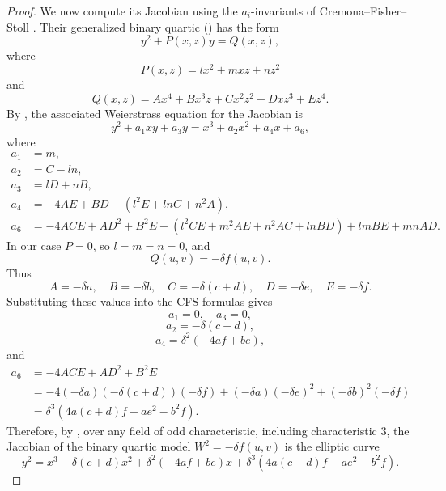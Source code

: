 \documentclass[11pt]{article}
\theoremstyle{definition}
\theoremstyle{definition}
\begin{document}
\begin{proof}
We now compute its Jacobian using the $a_i$-invariants of Cremona--Fisher--Stoll \cite{cremona2010minimisation}. Their generalized binary quartic (\cite[Definition~2.2]{cremona2010minimisation}) has the form
$$y^2+P(x,z)y=Q(x,z),$$
where
$$P(x,z)=lx^2+mxz+nz^2$$
and
$$Q(x,z)=Ax^4+Bx^3z+Cx^2z^2+Dxz^3+Ez^4.$$
By \cite[Lemma 2.9, Theorem~2.10]{cremona2010minimisation}, the associated Weierstrass
equation for the Jacobian is
$$y^2+a_1xy+a_3y=x^3+a_2x^2+a_4x+a_6,$$
where
\begin{align*}
a_1&=m,\\
a_2&=C-ln,\\
a_3&=lD+nB,\\
a_4&=-4AE+BD-(l^2E+lnC+n^2A),\\
a_6&=-4ACE+AD^2+B^2E-(l^2CE+m^2AE+n^2AC+lnBD)+lmBE+mnAD.
\end{align*}
In our case $P=0$, so $l=m=n=0$, and
$$
Q(u,v)=-\delta f(u,v).
$$
Thus
$$
A=-\delta a,\quad B=-\delta b,\quad C=-\delta(c+d),\quad D=-\delta e,\quad
E=-\delta f.
$$
Substituting these values into the CFS formulas gives
$$a_1=0,\quad a_3=0,$$
$$a_2=-\delta(c+d),$$
$$a_4=\delta^2(-4af+be),$$
and
\begin{align*}
a_6
&=-4ACE+AD^2+B^2E\\
&=-4(-\delta a)(-\delta(c+d))(-\delta f)
  +(-\delta a)(-\delta e)^2+(-\delta b)^2(-\delta f)\\
&=\delta^3\left(4a(c+d)f-ae^2-b^2f\right).
\end{align*}
Therefore, by \cite[Theorem~2.10]{cremona2010minimisation}, over any field of
odd characteristic, including characteristic $3$, the Jacobian of the binary
quartic model $W^2=-\delta f(u,v)$ is the elliptic curve
\begin{equation}\label{eq:jacobian-weierstrass-model}
y^2=x^3-\delta(c+d)x^2+\delta^2(-4af+be)x
+\delta^3\left(4a(c+d)f-ae^2-b^2f\right).
\end{equation}


\end{proof}
\end{document}
